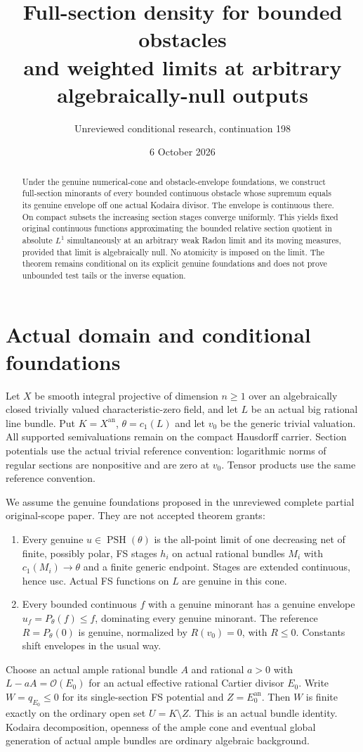 \documentclass[11pt]{article}
\title{Full-section density for bounded obstacles\protect\\
and weighted limits at arbitrary algebraically-null outputs}
\author{Unreviewed conditional research, continuation 198}
\date{6 October 2026}
\newcommand{\PSH}{\operatorname{PSH}}
\newcommand{\OO}{\mathcal O}
\begin{document}
\maketitle
\begin{abstract}
Under the genuine numerical-cone and obstacle-envelope foundations,
we construct full-section minorants of every bounded continuous
obstacle whose supremum equals its genuine envelope off one actual
Kodaira divisor. The envelope is continuous there. On compact subsets
the increasing section stages converge uniformly. This yields fixed
original continuous functions approximating the bounded relative
section quotient in absolute $L^1$ simultaneously at an arbitrary
weak Radon limit and its moving measures, provided that limit is
algebraically null. No atomicity is imposed on the limit. The theorem
remains conditional on its explicit genuine foundations and does not
prove unbounded test tails or the inverse equation.
\end{abstract}

\section{Actual domain and conditional foundations}
Let $X$ be smooth integral projective of dimension $n\geq1$ over an
algebraically closed trivially valued characteristic-zero field, and
let $L$ be an actual big rational line bundle. Put $K=X^{\mathrm{an}}$,
$\theta=c_1(L)$ and let $v_0$ be the generic trivial valuation.
All supported semivaluations remain on the compact Hausdorff carrier.
Section potentials use the actual trivial reference convention:
logarithmic norms of regular sections are nonpositive and are zero
at $v_0$. Tensor products use the same reference convention.

We assume the genuine foundations proposed in the unreviewed complete
partial original-scope paper. They are not accepted theorem grants:
\begin{enumerate}
\item Every genuine $u\in\PSH(\theta)$ is the all-point limit of
one decreasing net of finite, possibly polar, FS stages $h_i$ on
actual rational bundles $M_i$ with $c_1(M_i)\to\theta$ and a finite
generic endpoint. Stages are extended continuous, hence usc. Actual
FS functions on $L$ are genuine in this cone.
\item Every bounded continuous $f$ with a genuine minorant has a
genuine envelope $u_f=P_\theta(f)\leq f$, dominating every genuine
minorant. The reference $R=P_\theta(0)$ is genuine, normalized by
$R(v_0)=0$, with $R\leq0$. Constants shift envelopes in the usual way.
\end{enumerate}
Choose an actual ample rational bundle $A$ and rational $a>0$ with
$L-aA=\OO(E_0)$ for an actual effective rational Cartier divisor $E_0$.
Write $W=q_{E_0}\leq0$ for its single-section FS potential and
$Z=E_0^{\mathrm{an}}$. Then $W$ is finite exactly on the ordinary
open set $U=K\setminus Z$. This is an actual bundle identity.
Kodaira decomposition, openness of the ample cone and eventual global
generation of actual ample bundles are ordinary algebraic background.
\end{document}

